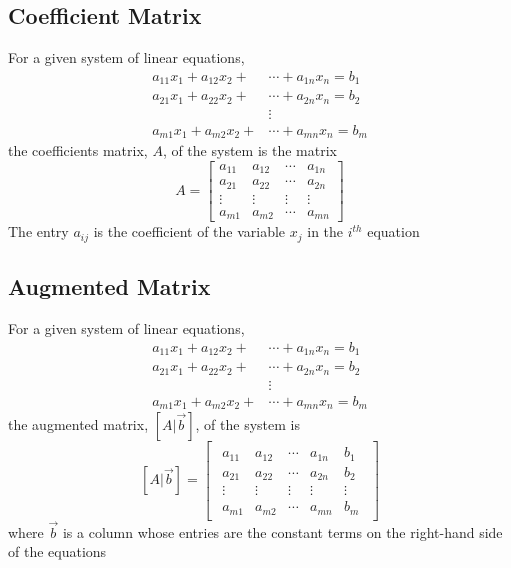 \documentclass[12pt, letterpaper]{article}
\begin{document}
\subsection{Coefficient Matrix}
For a given system of linear equations, 
\begin{align*}
    a_{11}x_1 + a_{12}x_2 + & \cdots + a_{1n}x_n = b_1 \\
    a_{21}x_1 + a_{22}x_2 + & \cdots + a_{2n}x_n = b_2 \\
                            & \vdots                   \\
    a_{m1}x_1 + a_{m2}x_2 + & \cdots + a_{mn}x_n = b_m 
\end{align*}
the coefficients matrix, $A$, of the system is the matrix 
\[A=\begin{bmatrix}
    a_{11} & a_{12} & \cdots & a_{1n} \\
    a_{21} & a_{22} & \cdots & a_{2n} \\
    \vdots & \vdots & \vdots & \vdots \\
    a_{m1} & a_{m2} & \cdots & a_{mn}
\end{bmatrix}\]
The entry $a_{ij}$ is the coefficient of the variable $x_j$ in the $i^{th}$ equation 
\subsection{Augmented Matrix}
For a given system of linear equations, 
\begin{align*}
    a_{11}x_1 + a_{12}x_2 + & \cdots + a_{1n}x_n = b_1 \\
    a_{21}x_1 + a_{22}x_2 + & \cdots + a_{2n}x_n = b_2 \\
                            & \vdots                   \\
    a_{m1}x_1 + a_{m2}x_2 + & \cdots + a_{mn}x_n = b_m 
\end{align*}
the augmented matrix, $[A|\vec{b}]$, of the system is 
\[[A|\vec{b}]=
\begin{bmatrix}
\begin{array}{cccc|c}
    a_{11} & a_{12} & \cdots & a_{1n} & b_1\\
    a_{21} & a_{22} & \cdots & a_{2n} & b_2\\
    \vdots & \vdots & \vdots & \vdots & \vdots\\
    a_{m1} & a_{m2} & \cdots & a_{mn} & b_m
\end{array}
\end{bmatrix}\]
where $\vec{b}$ is a column whose entries are the constant terms on the right-hand side of the equations 
\end{document}
